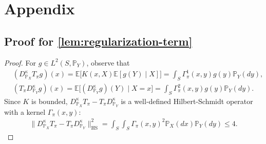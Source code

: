 \documentclass{article}
\begin{document}





\appendix
\section{Appendix}
\subsection{Proof for \cref{lem:regularization-term}}\label{pf:lem:regularization-term}
\begin{proof}
	For $g \in L^2(S,\mathbb{P}_Y)$, observe that
	\begin{align*}
		&(D_{\mathbb{P}_X}^{\kappa}T_{\pi}g)(x) = \mathbb{E}\Big[K(x,X)\mathbb{E}\left[g(Y) \mid X\right]\Big] = \int_S \Gamma_\pi^1(x,y)g(y)\mathbb{P}_Y(dy) , \\
		&(T_{\pi}D_{\mathbb{P}_Y}^{\kappa}g)(x) = \mathbb{E}\Big[(D_{\mathbb{P}_Y}^{\kappa}g)(Y) \mid X = x\Big] = \int_S \Gamma_\pi^2(x,y)g(y) \mathbb{P}_Y(dy) .
	\end{align*}
	Since $K$ is bounded, $D_{\mathbb{P}_X}^{\kappa}T_{\pi} - T_{\pi}D_{\mathbb{P}_Y}^{\kappa}$ is a well-defined Hilbert-Schmidt operator with a kernel $\Gamma_\pi(x,y)$:
	\begin{align*}
		\| D_{\mathbb{P}_X}^{\kappa}T_{\pi} - T_{\pi}D_{\mathbb{P}_Y}^{\kappa} \|_{\mathrm{HS}}^2 = \int_S\int_S \Gamma_\pi(x,y)^2\mathbb{P}_X(dx)\mathbb{P}_Y(dy) \leq 4 .
	\end{align*}
\end{proof}
\end{document}
